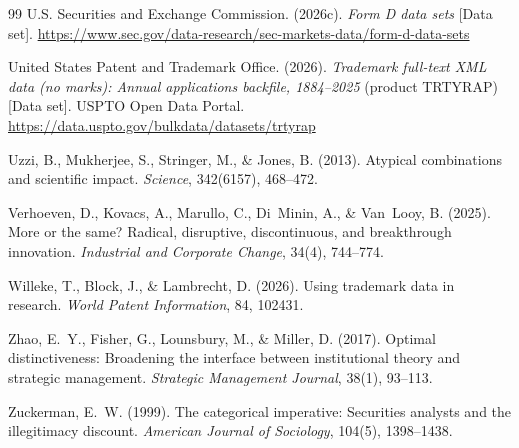 \begin{thebibliography}{99}
U.S. Securities and Exchange Commission. (2026c). \emph{Form D data sets}
[Data set]. \url{https://www.sec.gov/data-research/sec-markets-data/form-d-data-sets}

United States Patent and Trademark Office. (2026). \emph{Trademark full-text
XML data (no marks): Annual applications backfile, 1884--2025} (product
TRTYRAP) [Data set]. USPTO Open Data Portal.
\url{https://data.uspto.gov/bulkdata/datasets/trtyrap}

Uzzi, B., Mukherjee, S., Stringer, M., \& Jones, B. (2013). Atypical
combinations and scientific impact. \emph{Science}, 342(6157), 468--472.

Verhoeven, D., Kovacs, A., Marullo, C., Di~Minin, A., \& Van~Looy, B.
(2025). More or the same? Radical, disruptive, discontinuous, and
breakthrough innovation. \emph{Industrial and Corporate Change}, 34(4),
744--774.

Willeke, T., Block, J., \& Lambrecht, D. (2026). Using trademark data in
research. \emph{World Patent Information}, 84, 102431.

Zhao, E.~Y., Fisher, G., Lounsbury, M., \& Miller, D. (2017). Optimal
distinctiveness: Broadening the interface between institutional theory and
strategic management. \emph{Strategic Management Journal}, 38(1), 93--113.

Zuckerman, E.~W. (1999). The categorical imperative: Securities analysts
and the illegitimacy discount. \emph{American Journal of Sociology},
104(5), 1398--1438.

\end{thebibliography}
